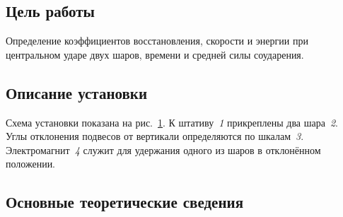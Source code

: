 \documentclass[a4paper, 12pt]{extarticle}
\begin{document}
\MTDTitlePage
\MTDInfoPage

\setcounter{section}{12}

\subsection{Цель работы}
Определение коэффициентов восстановления, скорости и энергии при центральном ударе двух шаров, времени и средней силы соударения. 

\subsection{Описание установки}

\begin{figure}[h]
\begin{center}
\end{center}
\caption{\label{fig:m12-equipment}}
\end{figure}

Схема установки показана на рис.~\ref{fig:m12-equipment}. К штативу~\emph{1} прикреплены два шара~\emph{2}. Углы отклонения подвесов от вертикали определяются по шкалам~\emph{3}. Электромагнит~\emph{4} служит для удержания одного из шаров в отклонённом положении. 

\subsection{Основные теоретические сведения}

\begin{figure}[h]
\begin{center}
\end{center}
\caption{\label{fig:m12-1}} %
\end{figure}

\begin{figure}[h]
\begin{center}
\end{center}
\caption{\label{fig:m12-2}}
\end{figure}
\end{document}
